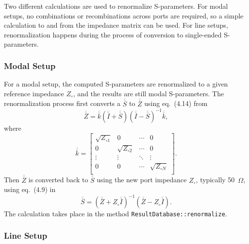 \documentclass[titlepage]{article}
\renewcommand\_{\textunderscore\linebreak[1]}
\begin{document}
Two different calculations are used to renormalize S-parameters.  For modal setups, no combinations or recombinations across ports are required, so a simple calculation to and from the impedance matrix can be used.  For line setups, renormalization happens during the process of conversion to single-ended S-parameters.

\subsubsection{Modal Setup}

For a modal setup, the computed S-parameters are renormalized to a given reference impedance $Z_\circ$, and the results are still modal S-parameters.  The renormalization process first converts a $\overline{\overline{S}}$ to $\overline{\overline{Z}}$ using eq.~(4.14) from \cite{Young}
\begin{equation}
\overline{\overline{Z}}=\overline{\overline{k}}\left(\overline{\overline{I}}+\overline{\overline{S}}\right)\left(\overline{\overline{I}}-\overline{\overline{S}}\right)^{-1}\overline{\overline{k}},
\end{equation}
where
\begin{equation}
\overline{\overline{k}}=\left[
\begin{array}{cccc}
\sqrt{Z_{\circ 1}} & 0 & \cdots & 0 \\
0 & \sqrt{Z_{\circ 2}} & \cdots & 0 \\
\vdots & \vdots & \ddots & \vdots \\
0 & 0 & \cdots & \sqrt{Z_{\circ N}} \\
\end{array}
\right].
\end{equation}
Then $\overline{\overline{Z}}$ is converted back to $\overline{\overline{S}}$ using the new port impedance $Z_{\circ}$, typically 50~$\Omega$, using eq.~(4.9) in \cite{Young}
\begin{equation}
\overline{\overline{S}}=\left( \overline{\overline{Z}}+Z_{\circ}\overline{\overline{I}}\right)^{-1}\left(\overline{\overline{Z}}-Z_{\circ}\overline{\overline{I}}\right).
\end{equation}
The calculation takes place in the method \texttt{ResultDatabase::renormalize}.

\subsubsection{Line Setup}
\end{document}
